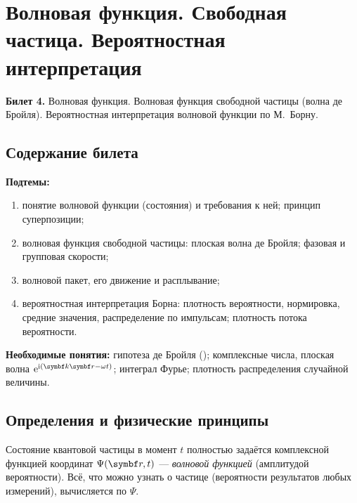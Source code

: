 \chapter[Волновая функция. Волна де Бройля. Интерпретация Борна]%
        {Волновая функция. Свободная частица. Вероятностная интерпретация}
\label{t:04}

\begin{qbox}
\textbf{Билет 4.} Волновая функция. Волновая функция свободной частицы (волна де Бройля).
Вероятностная интерпретация волновой функции по М.~Борну.
\end{qbox}

\section{Содержание билета}

\textbf{Подтемы:}
\begin{enumerate}
 \item понятие волновой функции (состояния) и требования к ней; принцип суперпозиции;
 \item волновая функция свободной частицы: плоская волна де Бройля; фазовая и групповая скорости;
 \item волновой пакет, его движение и расплывание;
 \item вероятностная интерпретация Борна: плотность вероятности, нормировка, средние значения,
       распределение по импульсам; плотность потока вероятности.
\end{enumerate}

\textbf{Необходимые понятия:} гипотеза де Бройля (); комплексные числа,
плоская волна $\ee^{\ii(\vect k\vect r-\omega t)}$; интеграл Фурье; плотность распределения
случайной величины.

\section{Определения и физические принципы}

\begin{definition}
Состояние квантовой частицы в момент $t$ полностью задаётся комплексной функцией координат
$\Psi(\vect r,t)$ — \emph{волновой функцией} (амплитудой вероятности). Всё, что можно узнать о
частице (вероятности результатов любых измерений), вычисляется по $\Psi$.
\end{definition}


